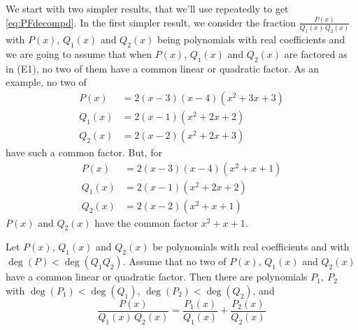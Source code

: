 We start with two simpler results, that we'll use repeatedly to get \eqref{eq:PFdecompd}. In the first simpler result, we consider the fraction $\frac{P(x)}{Q_1(x)\,Q_2(x)}$ with $P(x)$, $Q_1(x)$
and $Q_2(x)$ being polynomials with real coefficients and we are going to assume that when $P(x)$, $Q_1(x)$ and $Q_2(x)$ are factored as in (E1), 
no two of them have a common linear or quadratic factor. As an example, 
no two of
\begin{align*}
P(x) &= 2(x-3)(x-4)(x^2+3x+3)\\
Q_1(x) &= 2(x-1)(x^2+2x+2) \\
Q_2(x) &= 2(x-2)(x^2+2x+3)
\end{align*}
have such a common factor. But, for
\begin{align*}
P(x) &= 2(x-3)(x-4)(x^2+x+1) \\
Q_1(x) &= 2(x-1)(x^2+2x+2) \\
Q_2(x) &= 2(x-2)(x^2+x+1)
\end{align*}
$P(x)$ and $Q_2(x)$ have the common factor $x^2+x+1$.
\begin{lemma}\label{lemPFtwoFactors}
Let $P(x)$, $Q_1(x)$ and $Q_2(x)$ be polynomials with real coefficients and
with $\deg(P)<\deg(Q_1Q_2)$. Assume that no two of $P(x)$, $Q_1(x)$ and  
$Q_2(x)$  have a common linear or quadratic factor. Then there are 
polynomials $P_1,\ P_2$ with $\deg(P_1)<\deg(Q_1)$, $\deg(P_2)<\deg(Q_2)$, 
and
\begin{equation*}
\frac{P(x)}{Q_1(x)\,Q_2(x)}
=\frac{P_1(x)}{Q_1(x)} + \frac{P_2(x)}{Q_2(x)}
\end{equation*}
\end{lemma}
